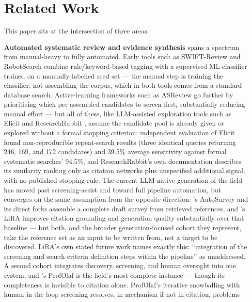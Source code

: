\section{Related Work}

This paper sits at the intersection of three areas.

\textbf{Automated systematic review and evidence synthesis} spans a spectrum from
manual-heavy to fully automated. Early tools such as SWIFT-Review \citep{Howard2016,Howard2020}
and RobotSearch \citep{Marshall2018RobotSearch} combine rule/keyword-based tagging with a
supervised ML classifier trained on a manually labelled seed set --- the manual step is training
the classifier, not assembling the corpus, which in both tools comes from a standard database
search. Active-learning frameworks such as ASReview \citep{vandeSchoot2021} go further
by prioritising which pre-assembled candidates to screen first, substantially reducing manual
effort --- but all of these, like LLM-assisted exploration tools such as Elicit
\citep{Bernard2025Elicit,Lau2025Elicit} and ResearchRabbit \citep{ColeBoutet2023ResearchRabbit},
assume the candidate pool is already given or explored without a formal stopping criterion:
independent evaluation of Elicit found non-reproducible repeat-search results (three identical
queries returning 246, 169, and 172 candidates) and 39.5\% average sensitivity against formal
systematic searches' 94.5\%, and ResearchRabbit's own documentation describes its similarity
ranking only as citation networks plus unspecified additional signal, with no published stopping
rule. The current LLM-native
generation of the field has moved past screening-assist and toward full pipeline automation,
but converges on the same assumption from the opposite direction: \citet{Wang2024AutoSurvey}'s
AutoSurvey and its direct forks assemble a complete draft survey from retrieved references, and
\citet{Go2026LiRA}'s LiRA improves citation grounding and generation quality substantially over
that baseline --- but both, and the broader generation-focused cohort they represent, take the
reference set as an input to be written from, not a target to be discovered. LiRA's own stated
future work names exactly this: ``integration of the screening and search criteria definition
steps within the pipeline'' as unaddressed. A second cohort integrates discovery, screening, and
human oversight into one system, and \citet{Afonso2025ProfOlaf}'s ProfOlaf is the field's most
complete instance --- though its completeness is invisible to citation alone. ProfOlaf's iterative
snowballing with human-in-the-loop screening resolves, in mechanism if not in citation, problems
